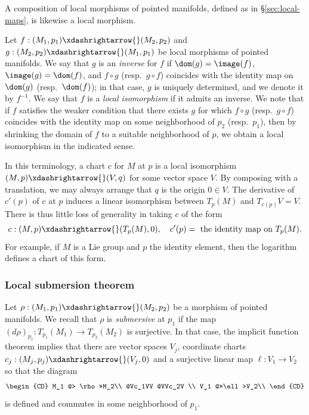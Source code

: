 A composition of local morphisms of pointed manifolds, defined as in \S\ref{sec:local-maps}, is likewise a local morphism.

Let $f : (M_1,p_1) \xdashrightarrow{} (M_2,p_2)$ and $g : (M_2,p_2) \xdashrightarrow{} (M_1,p_1)$ be local morphisms of pointed manifolds.  We say that $g$ is an \emph{inverse} for $f$ if $\dom(g) = \image(f)$, $\image(g) = \dom(f)$, and $f \circ g$ (resp.\ $g \circ f$) coincides with the identity map on $\dom(g)$ (resp.\ $\dom(f)$); in that case, $g$ is uniquely determined, and we denote it by $f^{-1}$.  We say that $f$ is a \emph{local isomorphism} if it admits an inverse.  We note that if $f$ satisfies the weaker condition that there exists $g$ for which $f \circ g$ (resp.\ $g \circ f$) coincides with the identity map on some neighborhood of $p_2$ (resp.\ $p_1$), then by shrinking the domain of $f$ to a suitable neighborhood of $p$, we obtain a local isomorphism in the indicated sense.

In this terminology, a chart $c$ for $M$ at $p$ is a local isomorphism $(M,p) \xdashrightarrow{} (V,q)$ for some vector space $V$.  By composing with a translation, we may always arrange that $q$ is the origin $0 \in V$.  The derivative of $c'(p)$ of $c$ at $p$ induces a linear isomorphism between $T_p(M)$ and $T_{c(p)} V = V$.  There is thus little loss of generality in taking $c$ of the form
\begin{equation}\label{eq:c-:-m}
  c : (M,p) \xdashrightarrow{} (T_p(M), 0),
  \quad
  c'(p) = \text{ the identity map on } T_p(M).
\end{equation}
For example, if $M$ is a Lie group and $p$ the identity element, then the logarithm defines a chart of this form.


\subsubsection{Local submersion theorem}\label{sec:inverse-funct-theor}
Let $\rho : (M_1, p_1) \xdashrightarrow{} (M_2, p_2)$ be a morphism of pointed manifolds.  We recall that $\rho$ is \emph{submersive} at $p_1$ if the map $(d \rho)_{p_1} : T_{p_1}(M_1) \rightarrow T_{p_2}(M_2)$ is surjective.  In that case, the implicit function theorem implies that there are vector spaces $V_j$, coordinate charts $c_j : (M_j, p_j) \xdashrightarrow{} (V_j,0)$ and a surjective linear map $\ell : V_1 \rightarrow V_2$ so that the diagram
\begin{equation*}
  \begin{CD}
    M_1 @> \rho >>M_2\\
    @Vc_1VV  @VVc_2V \\
    V_1 @>>\ell>V_2\\
  \end{CD}
\end{equation*}
is defined and commutes in some neighborhood of $p_1$.

